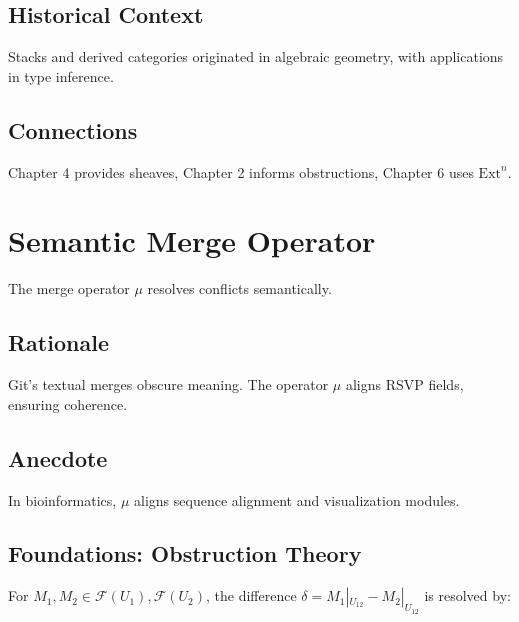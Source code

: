 \documentclass[12pt]{article}
\begin{document}
\subsection{Historical Context}
Stacks and derived categories originated in algebraic geometry, with applications in type inference.

\subsection{Connections}
Chapter 4 provides sheaves, Chapter 2 informs obstructions, Chapter 6 uses $\mathrm{Ext}^n$.

\begin{center}
\end{center}

\section{Semantic Merge Operator}
\label{sec:chapter6}

The merge operator $\mu$ resolves conflicts semantically.

\subsection{Rationale}
Git’s textual merges obscure meaning. The operator $\mu$ aligns RSVP fields, ensuring coherence.

\subsection{Anecdote}
In bioinformatics, $\mu$ aligns sequence alignment and visualization modules.

\subsection{Foundations: Obstruction Theory}
For $M_1, M_2 \in \mathcal{F}(U_1), \mathcal{F}(U_2)$, the difference $\delta = M_1|_{U_{12}} - M_2|_{U_{12}}$ is resolved by:
\end{document}
